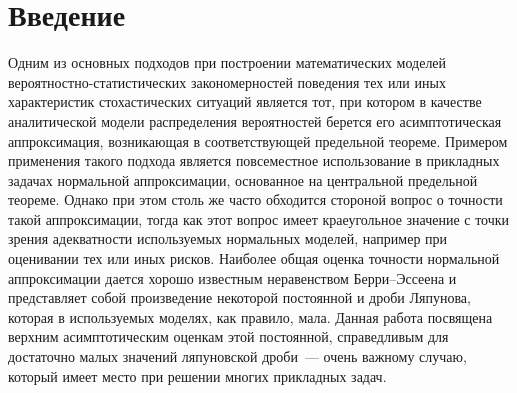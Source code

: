
      \thispagestyle{headings}

      \begin{multicols}{2}

      \label{st\stat}

\section{Введение}

Одним из основных подходов при построении математических моделей
вероятностно-ста\-тис\-ти\-ческих закономерностей поведения тех или иных
характеристик стохастических ситуаций является тот, при котором в
качестве аналитической модели распределения вероятностей берется его
асимптотическая аппроксимация, воз\-ни\-ка\-ющая в соответствующей
предельной теореме. Примером применения такого подхода является
повсеместное использование в прикладных задачах нормальной
аппроксимации, основанное на центральной предельной теореме. Однако
при этом столь же часто обходится стороной вопрос о точности такой
аппроксимации, тогда как этот вопрос имеет крае\-уголь\-ное значение с
точки зрения аде\-кват\-ности используемых нормальных моделей, например
при оценивании тех или иных рисков. Наиболее общая оценка точности
нормальной аппроксимации дается хорошо известным неравенством
Берри--Эс\-се\-ена и представляет собой произведение некоторой
постоянной и дроби Ляпунова, которая в используемых моделях, как
правило, мала. Данная работа посвящена верхним асимптотическим
оценкам этой постоянной, справедливым для достаточно малых значений
ляпуновской дроби~--- очень важному случаю, который имеет место при
решении многих прикладных задач.


\end{multicols}
